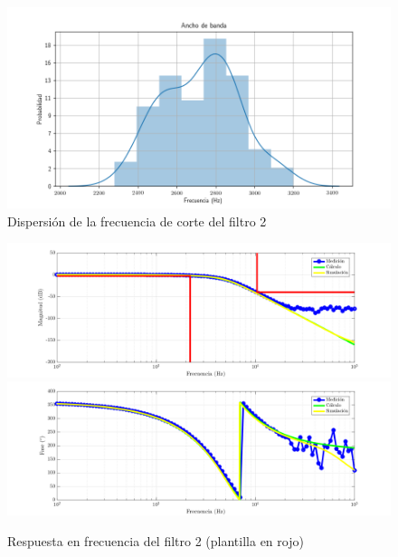 \documentclass[../../tc_tp5_main.tex]{subfiles}
\begin{document}
\begin{figure}[H]
	\centering
	\includegraphics[scale=0.7]{imagenes/bes_hist_bw.png}
	\caption{Dispersi\'on de la frecuencia de corte del filtro 2}
\end{figure}

\begin{figure}[H]
	\centering
	\includegraphics[scale=0.7]{imagenes/tc_tp5_ej1_bes_mag.png}
	\includegraphics[scale=0.7]{imagenes/tc_tp5_ej1_bes_fase.png}
	\caption{Respuesta en frecuencia del filtro 2 (plantilla en rojo)}
\end{figure}
\end{document}
